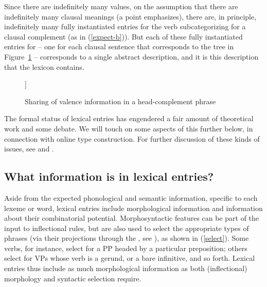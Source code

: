 \documentclass[output=paper
 	        ,biblatex
                ,babelshorthands
                ,newtxmath
                ,draftmode
                ,colorlinks, citecolor=brown
]{langscibook}
\begin{document}
Since there are indefinitely many  values, on the assumption that there are indefinitely many clausal meanings (a point \citealt[8--9]{Jackendoff1990} emphasizes), there are, in principle, indefinitely many fully instantiated entries for the verb  subcategorizing for a clausal complement (as in (\ref{expect-b})). 
But each of these fully instantiated entries for  -- one for each clausal sentence that corresponds to the tree in Figure~\ref{expect-b-tree} -- corresponds to a single abstract description, and it is this description that the lexicon contains. 

\begin{figure}
	\begin{forest}
	[ [{\avm{[comps & < \1 >]}} ] 
	[{\avm{[synsem & \1 ]}} ] ]
\end{forest}	
\caption{\label{expect-b-tree} Sharing of valence information in a head-complement phrase}
\end{figure}


The formal status of lexical entries has engendered a fair amount of theoretical work and some debate.
We will touch on some aspects of this further below, in connection with online type construction.
For further discussion of these kinds of issues, see  and .

\subsection{What information is in lexical entries?}
\label{lexicon:sec-what-information-is-in-lexical-entries}

Aside from the expected phonological and semantic information, specific to each lexeme or word, lexical entries include morphological information and information about their combinatorial potential. Morphosyntactic features can be part of the input to inflectional rules, but are also used to select the appropriate types of phrases (via their projections through the , see \crossrefchapteralt[\pageref{page-hfp}]{properties}), as shown in (\ref{select}). Some verbs, for instance, select for a PP headed by a particular preposition; others select for VPs whose verb is a gerund, or a bare infinitive, and so forth. Lexical entries thus include as much morphological information as both (inflectional) morphology and syntactic selection require.
\end{document}
